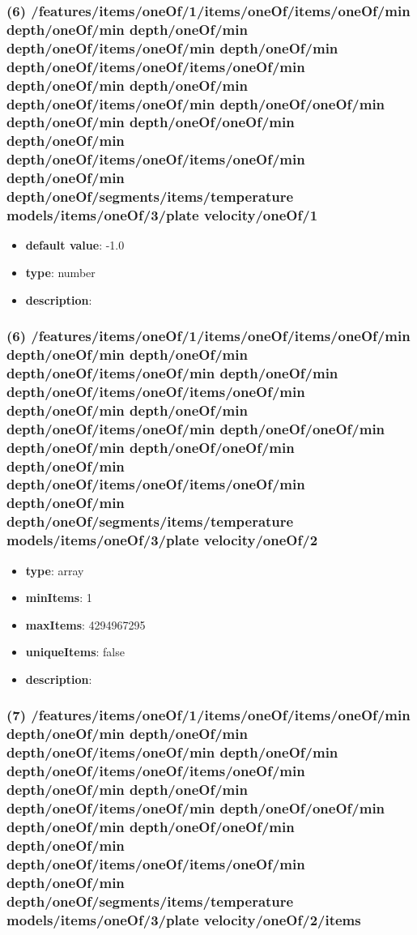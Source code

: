 \subsubsection{(6) /features/items/oneOf/1/items/oneOf/items/oneOf/min depth/oneOf/min depth/oneOf/min depth/oneOf/items/oneOf/min depth/oneOf/min depth/oneOf/items/oneOf/items/oneOf/min depth/oneOf/min depth/oneOf/min depth/oneOf/items/oneOf/min depth/oneOf/oneOf/min depth/oneOf/min depth/oneOf/oneOf/min depth/oneOf/min depth/oneOf/items/oneOf/items/oneOf/min depth/oneOf/min depth/oneOf/segments/items/temperature models/items/oneOf/3/plate velocity/oneOf/1}
\begin{itemize}[leftmargin=6em]\item {\bf default value}: -1.0
\item {\bf type}: number
\item {\bf description}: 
\end{itemize}\subsubsection{(6) /features/items/oneOf/1/items/oneOf/items/oneOf/min depth/oneOf/min depth/oneOf/min depth/oneOf/items/oneOf/min depth/oneOf/min depth/oneOf/items/oneOf/items/oneOf/min depth/oneOf/min depth/oneOf/min depth/oneOf/items/oneOf/min depth/oneOf/oneOf/min depth/oneOf/min depth/oneOf/oneOf/min depth/oneOf/min depth/oneOf/items/oneOf/items/oneOf/min depth/oneOf/min depth/oneOf/segments/items/temperature models/items/oneOf/3/plate velocity/oneOf/2}
\begin{itemize}[leftmargin=6em]\item {\bf type}: array
\item {\bf minItems}: 1
\item {\bf maxItems}: 4294967295
\item {\bf uniqueItems}: false
\item {\bf description}: 
\end{itemize}\subsubsection{(7) /features/items/oneOf/1/items/oneOf/items/oneOf/min depth/oneOf/min depth/oneOf/min depth/oneOf/items/oneOf/min depth/oneOf/min depth/oneOf/items/oneOf/items/oneOf/min depth/oneOf/min depth/oneOf/min depth/oneOf/items/oneOf/min depth/oneOf/oneOf/min depth/oneOf/min depth/oneOf/oneOf/min depth/oneOf/min depth/oneOf/items/oneOf/items/oneOf/min depth/oneOf/min depth/oneOf/segments/items/temperature models/items/oneOf/3/plate velocity/oneOf/2/items}
